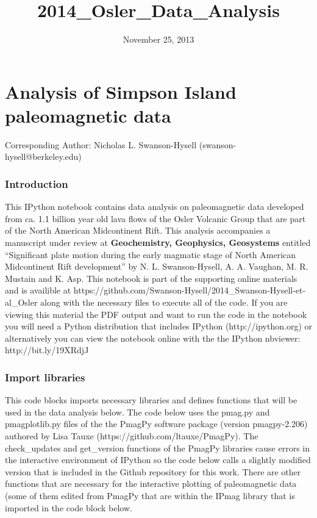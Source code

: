 \documentclass[letterpaper,10pt,english]{/Users/polarwander/Library/Enthought/Canopy_64bit/User/lib/python2.7/site-packages/sphinx/texinputs/sphinxhowto}
\title{2014\_Osler\_Data\_Analysis}
\date{November 25, 2013}
\begin{document}
        
            \maketitle
        

        


        
        \part{Analysis of Simpson Island paleomagnetic data}Corresponding Author: Nicholas L. Swanson-Hysell
(swanson-hysell@berkeley.edu)\section{Introduction}This IPython notebook contains data analysis on paleomagnetic data
developed from ca. 1.1 billion year old lava flows of the Osler Volcanic
Group that are part of the North American Midcontinent Rift. This
analysis accompanies a manuscript under review at \textbf{Geochemistry,
Geophysics, Geosystems} entitled ``Significant plate motion during the
early magmatic stage of North American Midcontinent Rift development''
by N. L. Swanson-Hysell, A. A. Vaughan, M. R. Mustain and K. Asp. This
notebook is part of the supporting online materials and is availible at
https://github.com/Swanson-Hysell/2014\_Swanson-Hysell-et-al\_Osler
along with the necessary files to execute all of the code. If you are
viewing this material the PDF output and want to run the code in the
notebook you will need a Python distribution that includes IPython
(http://ipython.org) or alternatively you can view the notebook online
with the the IPython nbviewer: http://bit.ly/19XRdjJ\section{Import libraries}This code blocks imports necessary libraries and defines functions that
will be used in the data analysis below. The code below uses the pmag.py
and pmagplotlib.py files of the the PmagPy software package (version
pmagpy-2.206) authored by Lisa Tauxe (https://github.com/ltauxe/PmagPy).
The check\_updates and get\_version functions of the PmagPy libraries
cause errors in the interactive environment of IPython so the code below
calls a slightly modified version that is included in the Github
repository for this work. There are other functions that are necessary
for the interactive plotting of paleomagnetic data (some of them edited
from PmagPy that are within the IPmag library that is imported in the
code block below.
\end{document}
